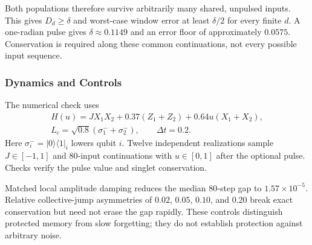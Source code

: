 Both populations therefore survive arbitrarily many shared, unpulsed
inputs. This gives $D_d\geq\delta$ and worst-case window error at least
$\delta/2$ for every finite $d$. A one-radian pulse gives
$\delta\approx0.1149$ and an error floor of approximately $0.0575$.
Conservation is required along these common continuations, not every
possible input sequence.

\subsubsection{Dynamics and Controls}
\label{app:protected-implementation}

The numerical check uses
\[
 \begin{gathered}
 H(u)=JX_1X_2+0.37(Z_1+Z_2)+0.64u(X_1+X_2),\\
 L_c=\sqrt{0.8}(\sigma_1^-+\sigma_2^-),\qquad\Delta t=0.2.
 \end{gathered}
\]
Here $\sigma_i^-=|0\rangle\langle1|_i$ lowers qubit $i$.
Twelve independent realizations sample $J\in[-1,1]$ and 80-input
continuations with $u\in[0,1]$ after the optional pulse. Checks verify
the pulse value and singlet conservation.

Matched local amplitude damping reduces the median 80-step gap to
$1.57\times10^{-5}$. Relative collective-jump asymmetries of $0.02$,
$0.05$, $0.10$, and $0.20$ break exact conservation but need not erase
the gap rapidly. These controls distinguish protected memory from slow
forgetting; they do not establish protection against arbitrary noise.
